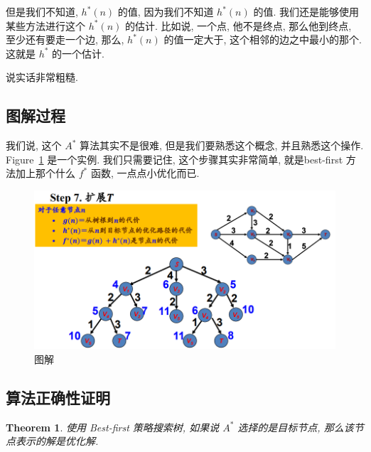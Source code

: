 \documentclass[a4paper, 10pt]{ctexart} %
\newtheorem{theorem}{Theorem}
\begin{document}
但是我们不知道, $h ^{*} \left(n\right)$ 的值, 因为我们不知道 $h ^{*} \left( n\right)$ 的值. 
我们还是能够使用某些方法进行这个 $h ^{*} \left(n\right)$ 的估计. 
比如说, 一个点, 他不是终点, 那么他到终点, 至少还有要走一个边, 
那么, $h ^{*} \left(n\right)$ 的值一定大于, 
这个相邻的边之中最小的那个. 
这就是 $h ^{*} $ 的一个估计.

说实话非常粗糙.

\subsection{图解过程} %
\label{sub:图解过程}

我们说, 这个 $A ^{*}$ 算法其实不是很难, 但是我们要熟悉这个概念, 并且熟悉这个操作. Figure~\ref{fig:tujie} 
是一个实例. 我们只需要记住, 这个步骤其实非常简单, 就是best-first 
方法加上那个什么 $f ^{*} $ 函数, 
一点点小优化而已.
\begin{figure}
    \centering
    \includegraphics[scale = 0.5]{ss11.png}
    \caption{图解}
    \label{fig:tujie}
\end{figure}
\subsection{算法正确性证明} %
\label{sub:算法正确性证明}
\begin{theorem}
使用 Best-first 策略搜索树, 
如果说 $A ^{*}$ 选择的是目标节点, 
那么该节点表示的解是优化解.
\end{theorem}
\end{document}
